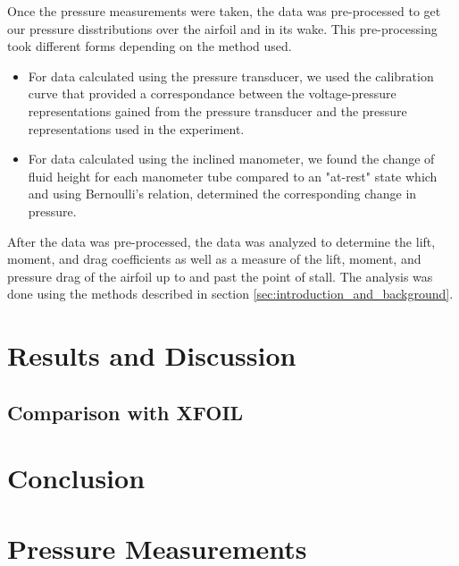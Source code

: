 \documentclass[runningheads]{llncs}
\begin{document}
Once the pressure measurements were taken, the data was pre-processed to get our pressure disstributions over the airfoil and in its wake. This pre-processing took different forms depending on the method used.

\begin{itemize}

    \item For data calculated using the pressure transducer, we used the calibration curve that provided a correspondance between the voltage-pressure representations gained from the pressure transducer and the pressure representations used in the experiment.

    \item For data calculated using the inclined manometer, we found the change of fluid height for each manometer tube compared to an "at-rest" state which and using Bernoulli's relation, determined the corresponding change in pressure.

\end{itemize}

After the data was pre-processed, the data was analyzed to determine the lift, moment, and drag coefficients as well as a measure of the lift, moment, and pressure drag of the airfoil up to and past the point of stall. The analysis was done using the methods described in section \ref{sec:introduction_and_background}.




\section{Results and Discussion}

\subsection{Comparison with XFOIL}



\section{Conclusion}










\appendix
\section{Pressure Measurements}
\end{document}
